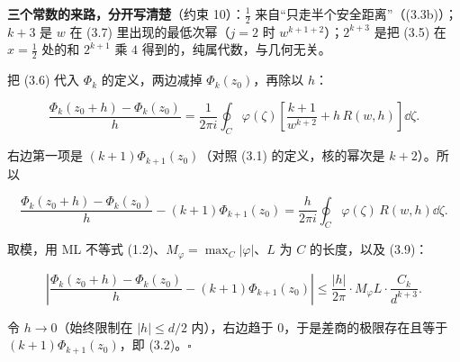 \documentclass[11pt]{ctexart}
\let\origsubhdr\subhdr
\renewcommand{\subhdr}[1]{\par\origsubhdr{#1}}
\begin{document}

\noindent\textbf{三个常数的来路，分开写清楚}（约束 10）：$\frac12$ 来自“只走半个安全距离”（(3.3b)）；$k+3$ 是 $w$ 在 (3.7) 里出现的最低次幂（$j=2$ 时 $w^{k+1+2}$）；$2^{k+3}$ 是把 (3.5) 在 $x=\frac12$ 处的和 $2^{k+1}$ 乘 $4$ 得到的，纯属代数，与几何无关。


把 (3.6) 代入 $\Phi_k$ 的定义，两边减掉 $\Phi_k(z_0)$，再除以 $h$：

\begin{equation}
\frac{\Phi_k(z_0+h)-\Phi_k(z_0)}{h}
=\frac{1}{2\pi i}\oint_C\varphi(\zeta)\left[\frac{k+1}{w^{k+2}}+h\,R(w,h)\right]\dd\zeta .
\tag{3.11}
\end{equation}

右边第一项是 $(k+1)\Phi_{k+1}(z_0)$（对照 (3.1) 的定义，核的幂次是 $k+2$）。所以

\begin{equation}
\frac{\Phi_k(z_0+h)-\Phi_k(z_0)}{h}-(k+1)\Phi_{k+1}(z_0)
=\frac{h}{2\pi i}\oint_C\varphi(\zeta)\,R(w,h)\dd\zeta .
\tag{3.12}
\end{equation}

取模，用 ML 不等式 (1.2)、$M_\varphi=\max_C|\varphi|$、$L$ 为 $C$ 的长度，以及 (3.9)：

\begin{equation}
\left|\frac{\Phi_k(z_0+h)-\Phi_k(z_0)}{h}-(k+1)\Phi_{k+1}(z_0)\right|
\le\frac{|h|}{2\pi}\cdot M_\varphi L\cdot\frac{C_k}{d^{k+3}} .
\tag{3.13}
\end{equation}

令 $h\to0$（始终限制在 $|h|\le d/2$ 内），右边趋于 $0$，于是差商的极限存在且等于 $(k+1)\Phi_{k+1}(z_0)$，即 (3.2)。$\square$


\end{document}
